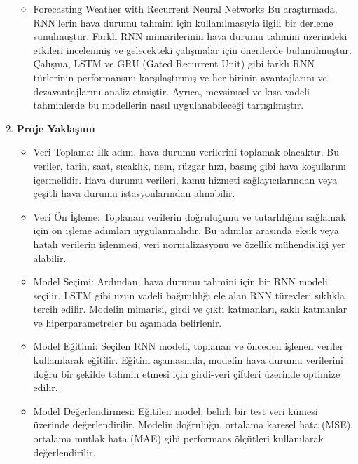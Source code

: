 \documentclass[12pt,a4paper]{article}
\begin{document}
\begin{enumerate}
\begin{itemize}
\item Forecasting Weather with Recurrent Neural Networks
Bu araştırmada, RNN'lerin hava durumu tahmini için kullanılmasıyla ilgili bir derleme sunulmuştur. Farklı RNN mimarilerinin hava durumu tahmini üzerindeki etkileri incelenmiş ve gelecekteki çalışmalar için önerilerde bulunulmuştur. Çalışma, LSTM ve GRU (Gated Recurrent Unit) gibi farklı RNN türlerinin performansını karşılaştırmış ve her birinin avantajlarını ve dezavantajlarını analiz etmiştir. Ayrıca, mevsimsel ve kısa vadeli tahminlerde bu modellerin nasıl uygulanabileceği tartışılmıştır\cite{L3}.
\end{itemize}


\item  {\bf\fontsize{12pt}{14pt}\selectfont Proje Yaklaşımı}\newline\newline
\begin{itemize}
\item Veri Toplama: İlk adım, hava durumu verilerini toplamak olacaktır. Bu veriler, tarih, saat, sıcaklık, nem, rüzgar hızı, basınç gibi hava koşullarını içermelidir. Hava durumu verileri, kamu hizmeti sağlayıcılarından veya çeşitli hava durumu istasyonlarından alınabilir.

\item Veri Ön İşleme: Toplanan verilerin doğruluğunu ve tutarlılığını sağlamak için ön işleme adımları uygulanmalıdır. Bu adımlar arasında eksik veya hatalı verilerin işlenmesi, veri normalizasyonu ve özellik mühendisliği yer alabilir.

\item Model Seçimi: Ardından, hava durumu tahmini için bir RNN modeli seçilir. LSTM gibi uzun vadeli bağımlılığı ele alan RNN türevleri sıklıkla tercih edilir. Modelin mimarisi, girdi ve çıktı katmanları, saklı katmanlar ve hiperparametreler bu aşamada belirlenir.

\item Model Eğitimi: Seçilen RNN modeli, toplanan ve önceden işlenen veriler kullanılarak eğitilir. Eğitim aşamasında, modelin hava durumu verilerini doğru bir şekilde tahmin etmesi için girdi-veri çiftleri üzerinde optimize edilir.

\item Model Değerlendirmesi: Eğitilen model, belirli bir test veri kümesi üzerinde değerlendirilir. Modelin doğruluğu, ortalama karesel hata (MSE), ortalama mutlak hata (MAE) gibi performans ölçütleri kullanılarak değerlendirilir.


\end{itemize}
\end{enumerate}
\end{document}
